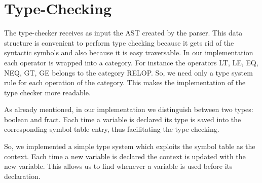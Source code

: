 \section{Type-Checking}
\label{sec:type-checking}

The type-checker receives as input the AST created by the 
parser. This data structure is convenient to perform
type checking because it gets rid of the syntactic symbols and also because it 
is easy traversable.
In our implementation each operator is wrapped into a category.
For instance the operators LT, LE, EQ, NEQ, GT, GE belongs to the category 
RELOP. So, we need only a type system rule for each operation of the category.
This makes the implementation of the type checker more readable.


As already mentioned, in our implementation we distinguish between two types:
boolean and fract. Each time a variable is declared its type is saved into the 
corresponding symbol table entry, thus facilitating the type checking.

So, we implemented a simple type system which exploits the symbol
table as the context. Each time a new variable is declared 
the context is updated with the new variable. This allows us to find whenever
a variable is used before its declaration.
